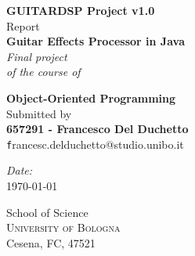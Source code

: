 \begin{titlepage}

\begin{center}

\textup{\small {\bf GUITARDSP Project v1.0} \\ Report}\\[0.2in]

\Large \textbf {Guitar Effects Processor in Java}\\[0.5in]

       \small \emph{Final project\\
       of the course of}
        \vspace{.2in}

       {\bf Object-Oriented Programming}\\[1in]

\normalsize Submitted by \\
	{\large \bf 657291 - Francesco Del Duchetto}\\
	{\texttt francesc.delduchetto@studio.unibo.it}

\vspace{0.3in}
\emph{Date:}\\
\today
\vfill

\Large{School of Science}\\
\normalsize
\textsc{University of Bologna}\\
	Cesena, FC, 47521\\
\end{center}

\end{titlepage}
